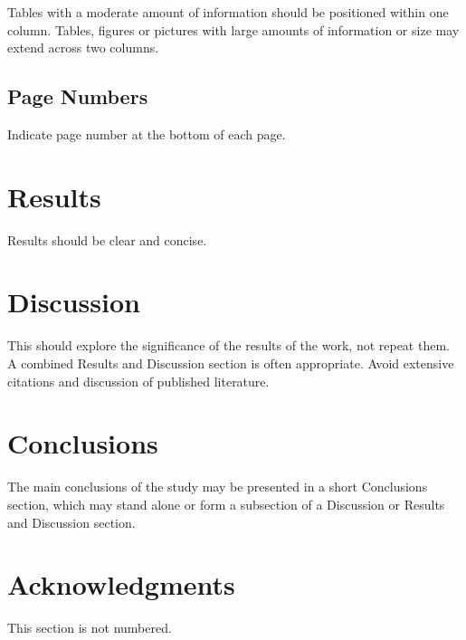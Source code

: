 \documentclass[]{iac}
\begin{document}
Tables with a moderate amount of information should be positioned within one column. Tables, figures or pictures with large amounts of information or size may extend across two columns.

\subsection{Page Numbers}
Indicate page number at the bottom of each page.

\section{Results}
Results should be clear and concise.

\section{Discussion}
This should explore the significance of the results of the work, not repeat them. A combined Results and Discussion section is often appropriate. Avoid extensive citations and discussion of published literature.

\section{Conclusions}
The main conclusions of the study may be presented in a short Conclusions section, which may stand alone or form a subsection of a Discussion or Results and Discussion section.

\section*{Acknowledgments}
This section is not numbered. 



\end{document}
